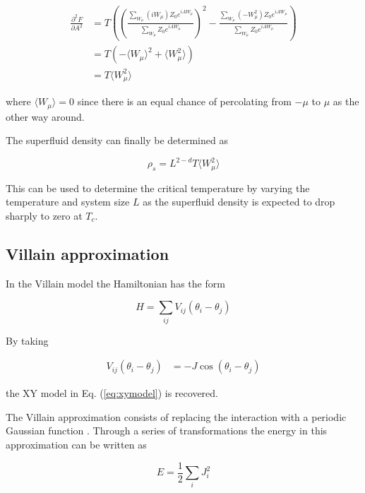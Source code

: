 \begin{align}
    \frac{\partial^2 F}{\partial A^2} &= T \left ( \left ( \frac{\sum_{W_\mu} (i W_\mu) Z_0 e^{iAW_\mu}}{\sum_{W_\mu} Z_0 e^{iAW_\mu}} \right )^2 - \frac{\sum_{W_\mu} (- W_\mu^2) Z_0 e^{iAW_\mu}}{\sum_{W_\mu} Z_0 e^{iAW_\mu}} \right ) \\
%
    &= T \left ( -\langle W_\mu \rangle^2 + \langle W_\mu^2 \rangle \right ) \\
%
    &= T \langle W_\mu^2 \rangle
\end{align}

\noindent where $\langle W_\mu \rangle = 0$ since there is an equal chance of percolating from $-\mu$ to $\mu$ as the other way around.

The superfluid density can finally be determined as

\begin{equation}
    \rho_s = L^{2 - d} T \langle W_\mu^2 \rangle 
\end{equation}

\noindent This can be used to determine the critical temperature by varying the temperature and system size $L$ as the superfluid density is expected to drop sharply to zero at $T_c$. 

\subsection{Villain approximation}
\label{subsec:villainApprox}


In the Villain model the Hamiltonian has the form \cite{Villain:VillainOriginalPaper}

\begin{equation}    
    H = \sum_{ij} V_{ij}( \theta_i - \theta_j)
\end{equation}

\noindent By taking

\begin{align}
    V_{ij}( \theta_i - \theta_j) &= -J \cos ( \theta_i - \theta_j)
\end{align}

\noindent the XY model in Eq. (\ref{eq:xymodel}) is recovered.

The Villain approximation consists of replacing the interaction with a periodic Gaussian function \cite{Villain:VillainOriginalPaper}. Through a series of transformations the energy in this approximation can be written as \cite{Jos:VillainExtended}

\begin{equation}
    E = \frac{1}{2} \sum_i J_i^2
\end{equation}

